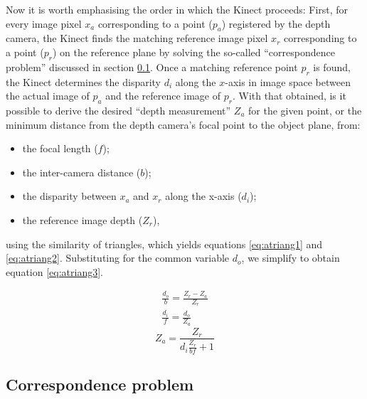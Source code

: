Now it is worth emphasising the order in which the Kinect proceeds: First, for
every image pixel $x_a$ corresponding to a point ($p_a$) registered by the depth
camera, the Kinect finds the matching reference image pixel $x_r$ corresponding
to a point ($p_r$) on the reference plane by solving the so-called
``correspondence problem'' discussed in section \ref{sub:corr}. Once a matching
reference point $p_r$ is found, the Kinect determines the disparity $d_i$ along
the $x$-axis in image space between the actual image of $p_a$ and the reference
image of $p_r$. With that obtained, is it possible to derive the desired ``depth
measurement'' $Z_a$ for the given point, or the minimum distance from the depth
camera's focal point to the object plane, from: 

\begin{itemize}

    \item the focal length ($f$);

    \item the inter-camera distance ($b$);

    \item the disparity between $x_a$ and $x_r$ along the x-axis ($d_i$);

    \item the reference image depth ($Z_r$),

\end{itemize}

using the similarity of triangles, which yields equations \ref{eq:atriang1} and
\ref{eq:atriang2}. Substituting for the common variable $d_o$, we simplify to
obtain equation \ref{eq:atriang3}.

\begin{align} 
    \frac{d_o}{b} = \frac{Z_r - Z_a}{Z_r} \label{eq:atriang1}\\
    \frac{d_i}{f} = \frac{d_o}{Z_a} \label{eq:atriang2}
\end{align}
\begin{equation} \label{eq:atriang3}
    Z_a = \frac{Z_r}{d_i \frac{Z_r}{b f} + 1}
\end{equation}



\subsection{Correspondence problem}
\label{sub:corr}


